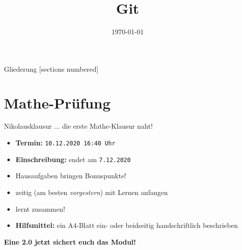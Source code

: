 



\newtoggle{Diplom} \togglefalse{Diplom}
\newtoggle{Bachelor} \togglefalse{Bachelor}
\toggletrue{\abschluss}

\newcommand{\git}[0]{\texttt{git} }

\title{Git}
\date{\today}




\maketitle

\begin{frame}{Gliederung}
	[sections numbered]
	\tableofcontents
\end{frame}


\section{Mathe-Prüfung}
\begin{frame}{Nikolausklausur}
    ... die erste Mathe-Klausur naht!
    \begin{itemize}
        \item \textbf{Termin:} \texttt{10.12.2020 16:40 Uhr}
	\item \textbf{Einschreibung:} endet am \texttt{7.12.2020}
        \item Hausaufgaben bringen Bonuspunkte!
        \item zeitig (am besten \emph{vorgestern}) mit Lernen anfangen
        \item lernt zusammen!
	\item \textbf{Hilfsmittel:} ein A4-Blatt ein- oder beidseitig handschriftlich beschrieben
    \end{itemize}

    \vfill

    \centering \LARGE \alert{\textbf{Eine 2.0 jetzt sichert euch das Modul!}}
\end{frame}

%


